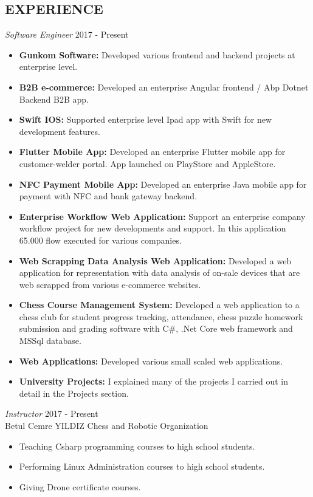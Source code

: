 \documentclass[line,margin]{res}
\begin{document}
\begin{resume}
\begin{itemize}
\section{EXPERIENCE} {\sl Software Engineer} \hfill  2017 - Present \\
                 \begin{itemize}  \itemsep -2pt %
                 \item \textbf{Gunkom Software: } Developed various frontend and backend projects at enterprise level. 
                 \item \textbf{B2B e-commerce: } Developed an enterprise Angular frontend / Abp Dotnet Backend B2B app. 
                 \item \textbf{Swift IOS: } Supported enterprise level Ipad app with Swift for new development features. 
                 \item \textbf{Flutter Mobile App: } Developed an enterprise Flutter mobile app for customer-welder portal. App launched on PlayStore and AppleStore. 
                 \item \textbf{NFC Payment Mobile App: } Developed an enterprise Java mobile app for payment with NFC and bank gateway backend. 
                 \item \textbf{Enterprise Workflow Web Application: } Support an enterprise company workflow project for new developments and support. In this application 65.000 flow executed for various companies. 
                 \item \textbf{Web Scrapping Data Analysis Web Application: } Developed a web application for representation with data analysis of on-sale devices that are web scrapped from various e-commerce websites. 
                 \item \textbf{Chess Course Management System: } Developed a web application to a chess club for student progress tracking, attendance, chess puzzle homework submission and grading software with C\#, .Net Core web framework and MSSql database. 
                \item \textbf{Web Applications: } Developed various small scaled web applications.
                \item \textbf{University Projects: } I explained many of the projects I carried out in detail in the Projects section.
                \end{itemize}
 
                {\sl  Instructor} \hfill             2017 - Present \\
                Betul Cemre YILDIZ Chess and Robotic Organization
                 \begin{itemize}  \itemsep -2pt %
                 \item Teaching Csharp programming courses to high school students.
                 \item Performing  Linux Administration courses to high school students.
                 \item Giving Drone certificate courses.
                 \end{itemize} 


\end{itemize}
\end{resume}
\end{document}
